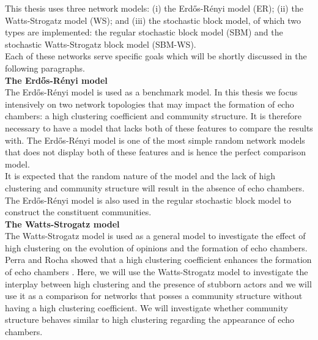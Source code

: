 \documentclass[11 pt , letterpaper , twoside , openright]{book}
\begin{document}
This thesis uses three network models: (i) the Erd\H{o}s-R\'{e}nyi model (ER); (ii) the Watts-Strogatz model (WS); and (iii) the stochastic block model, of which two types are implemented: the regular stochastic block model (SBM) and the stochastic Watts-Strogatz block model (SBM-WS).\\
\newline
Each of these networks serve specific goals which will be shortly discussed in the following paragraphs.\\
\newline
\textbf{The Erd\H{o}s-R\'{e}nyi model}\\
\newline
The Erd\H{o}s-R\'{e}nyi model is used as a benchmark model. In this thesis we focus intensively on two network topologies that may impact the formation of echo chambers: a high clustering coefficient and community structure. It is therefore necessary to have a model that lacks both of these features to compare the results with. The Erd\H{o}s-R\'{e}nyi model is one of the most simple random network models that does not display both of these features and is hence the perfect comparison model. \\
\newline
It is expected that the random nature of the model and the lack of high clustering and community structure will result in the absence of echo chambers.\\
\newline
The Erd\H{o}s-R\'{e}nyi model is also used in the regular stochastic block model to construct the constituent communities.\\
\newline
\textbf{The Watts-Strogatz model}\\
\newline
The Watts-Strogatz model is used as a general model to investigate the effect of high clustering on the evolution of opinions and the formation of echo chambers.\\
\newline
Perra and Rocha showed that a high clustering coefficient enhances the formation of echo chambers \cite{Perra2019}. Here, we will use the Watts-Strogatz model to investigate the interplay between high clustering and the presence of stubborn actors and we will use it as a comparison for networks that posses a community structure without having a high clustering coefficient. We will investigate whether community structure behaves similar to high clustering regarding the appearance of echo chambers.\\
\end{document}
